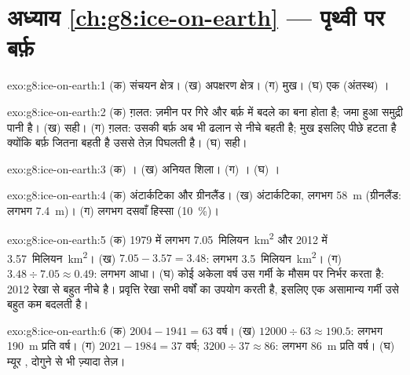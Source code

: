 \section*{अध्याय \ref{ch:g8:ice-on-earth} --- पृथ्वी पर बर्फ़}

\begin{solution}{exo:g8:ice-on-earth:1}
(क) संचयन क्षेत्र। (ख) अपक्षरण क्षेत्र। (ग) मुख। (घ) एक (अंतस्थ)
।
\end{solution}

\begin{solution}{exo:g8:ice-on-earth:2}
(क) ग़लत:  ज़मीन पर गिरे और बर्फ़ में बदले  का बना होता है; जमा हुआ समुद्री
पानी  है। (ख) सही। (ग) ग़लत: उसकी बर्फ़ अब भी ढलान से नीचे बहती है; मुख
इसलिए पीछे हटता है क्योंकि बर्फ़ जितना बहती है उससे तेज़ पिघलती है। (घ) सही।
\end{solution}

\begin{solution}{exo:g8:ice-on-earth:3}
(क) । (ख) अनियत शिला। (ग) । (घ) ।
\end{solution}

\begin{solution}{exo:g8:ice-on-earth:4}
(क) अंटार्कटिका और ग्रीनलैंड। (ख) अंटार्कटिका, लगभग \qty{58}{m} (ग्रीनलैंड: लगभग
\qty{7.4}{m})। (ग) लगभग दसवाँ हिस्सा (10~\%)।
\end{solution}

\begin{solution}{exo:g8:ice-on-earth:5}
(क) 1979 में लगभग \num{7.05}~मिलियन~\unit{km^2} और 2012 में
\num{3.57}~मिलियन~\unit{km^2}। (ख) $7.05 - 3.57 = 3.48$: लगभग
\num{3.5}~मिलियन~\unit{km^2}। (ग) $3.48 \div 7.05 \approx 0.49$: लगभग आधा। (घ) कोई
अकेला वर्ष उस गर्मी के मौसम पर निर्भर करता है: 2012 रेखा से बहुत नीचे है। प्रवृत्ति रेखा
सभी वर्षों का उपयोग करती है, इसलिए एक असामान्य गर्मी उसे बहुत कम बदलती है।
\end{solution}

\begin{solution}{exo:g8:ice-on-earth:6}
(क) $2004 - 1941 = 63$ वर्ष। (ख) $12000 \div 63 \approx 190.5$: लगभग
\qty{190}{m} प्रति वर्ष। (ग) $2021 - 1984 = 37$ वर्ष; $3200 \div 37 \approx
86$:
लगभग \qty{86}{m} प्रति वर्ष। (घ) म्यूर , दोगुने से भी ज़्यादा तेज़।
\end{solution}

